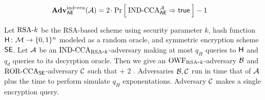 \begin{align*}
  \mathbf{Adv}^{\mathrm{ind\mbox{-} cca}}_{\textsf{AE}}({\mathcal A}) &= 2{\hspace{-0.1ex}}{\hspace{-0.1ex}}{\hspace{-0.1ex}}\cdot{\hspace{-0.1ex}}{\hspace{-0.1ex}}{\hspace{-0.1ex}}\Pr\left[\: \textnormal{IND-CCA}_{\textsf{AE}}^{\mathcal A}\Rightarrow\mathsf{true} \:\right] - 1
\end{align*}


\begin{theorem*}
Let $\textnormal{RSA}\mbox{-} k$ be the RSA-based scheme using
security parameter $k$, hash function
$\mathsf{H}{{\kern .05em}\colon{\kern .05em}}{\cal M}\rightarrow\{0,1\}^n$ modeled as a random oracle, and
symmetric encryption scheme $\textnormal{\textsf{SE}}$. Let ${\mathcal A}$ be
an $\textnormal{IND-CCA}_{\textnormal{RSA}\mbox{-} k}$-adversary making at most $q_H$ queries to
$\mathsf{H}$ and $q_d$ queries to its decyrption oracle. Then we give an
$\textnormal{OWF}_{\textnormal{RSA}\mbox{-} k}$-adversary ${\mathcal B}$ and $\textnormal{ROR-CCA}_{\textnormal{\textsf{SE}}}$-adversary
${\mathcal C}$ such that
\bnm
  \AdvINDCPA{\RSAk,\Horacle}{\advA} \cdotsm\AdvOWF{\RSAk}{\advB} +  
        2\cdotsm\AdvRORCCA{\SEscheme}{\advC}  \;.
\enm
Adversaries ${\mathcal B},{\mathcal C}$ run in time that of ${\mathcal A}$ plus 
the time to perform simulate $q_H$ exponentations. 
Adversary ${\mathcal C}$ makes a single encryption query.
\end{theorem*}







